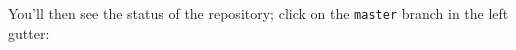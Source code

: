 \begin{fullwidth}
You'll then see the status of the repository; click on the {\tt master} branch in the left gutter:
\vspace{5mm}


\end{fullwidth}
